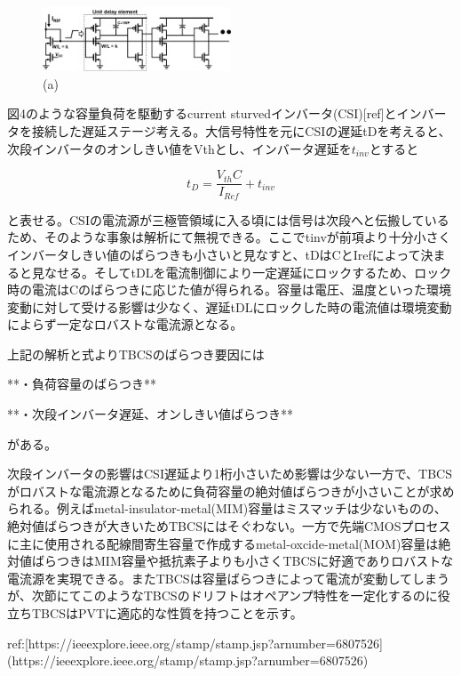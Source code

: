 \documentclass[letterpaper, 10 pt, conference]{ieeeconf}  %
\begin{document}
\begin{figure}[!]
\centering
 \includegraphics[width=0.5\textwidth]{figs/inv.png}
  \caption{(a) 
}
\label{fig2}
\end{figure}

図4のような容量負荷を駆動するcurrent sturvedインバータ(CSI)[ref]とインバータを接続した遅延ステージ考える。大信号特性を元にCSIの遅延tDを考えると、次段インバータのオンしきい値をVthとし、インバータ遅延を$t_{inv}$とすると

$$t_D = \frac{V_{th}C}{I_{Ref}}+t_{inv}$$

と表せる。CSIの電流源が三極管領域に入る頃には信号は次段へと伝搬しているため、そのような事象は解析にて無視できる。ここでtinvが前項より十分小さくインバータしきい値のばらつきも小さいと見なすと、tDはCとIrefによって決まると見なせる。そしてtDLを電流制御により一定遅延にロックするため、ロック時の電流はCのばらつきに応じた値が得られる。容量は電圧、温度といった環境変動に対して受ける影響は少なく、遅延tDLにロックした時の電流値は環境変動によらず一定なロバストな電流源となる。

上記の解析と式よりTBCSのばらつき要因には

**・負荷容量のばらつき**

**・次段インバータ遅延、オンしきい値ばらつき**

がある。

次段インバータの影響はCSI遅延より1桁小さいため影響は少ない一方で、TBCSがロバストな電流源となるために負荷容量の絶対値ばらつきが小さいことが求められる。例えばmetal-insulator-metal(MIM)容量はミスマッチは少ないものの、絶対値ばらつきが大きいためTBCSにはそぐわない。一方で先端CMOSプロセスに主に使用される配線間寄生容量で作成するmetal-oxcide-metal(MOM)容量は絶対値ばらつきはMIM容量や抵抗素子よりも小さくTBCSに好適でありロバストな電流源を実現できる。またTBCSは容量ばらつきによって電流が変動してしまうが、次節にてこのようなTBCSのドリフトはオペアンプ特性を一定化するのに役立ちTBCSはPVTに適応的な性質を持つことを示す。

ref:[https://ieeexplore.ieee.org/stamp/stamp.jsp?arnumber=6807526](https://ieeexplore.ieee.org/stamp/stamp.jsp?arnumber=6807526)
\end{document}
